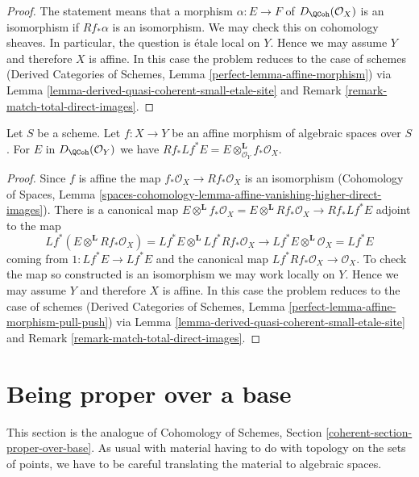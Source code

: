 \begin{proof}
The statement means that a morphism $\alpha : E \to F$ of
$D_\QCoh(\mathcal{O}_X)$ is an isomorphism if
$Rf_*\alpha$ is an isomorphism. We may check this on cohomology sheaves.
In particular, the question is \'etale local on $Y$. Hence we may assume
$Y$ and therefore $X$ is affine. In this case the problem reduces to the
case of schemes
(Derived Categories of Schemes, Lemma \ref{perfect-lemma-affine-morphism})
via Lemma \ref{lemma-derived-quasi-coherent-small-etale-site} and
Remark \ref{remark-match-total-direct-images}.
\end{proof}

\begin{lemma}
\label{lemma-affine-morphism-pull-push}
Let $S$ be a scheme. Let $f : X \to Y$ be an affine morphism of algebraic
spaces over $S$. For $E$ in $D_\QCoh(\mathcal{O}_Y)$ we have
$Rf_* Lf^* E = E \otimes^\mathbf{L}_{\mathcal{O}_Y} f_*\mathcal{O}_X$.
\end{lemma}

\begin{proof}
Since $f$ is affine the map $f_*\mathcal{O}_X \to Rf_*\mathcal{O}_X$
is an isomorphism (Cohomology of Spaces, Lemma
\ref{spaces-cohomology-lemma-affine-vanishing-higher-direct-images}).
There is a canonical map
$E \otimes^\mathbf{L} f_*\mathcal{O}_X =
E \otimes^\mathbf{L} Rf_*\mathcal{O}_X \to Rf_* Lf^* E$
adjoint to the map
$$
Lf^*(E \otimes^\mathbf{L} Rf_*\mathcal{O}_X) =
Lf^*E \otimes^\mathbf{L} Lf^*Rf_*\mathcal{O}_X \longrightarrow
Lf^* E \otimes^\mathbf{L} \mathcal{O}_X = Lf^* E
$$
coming from $1 : Lf^*E \to Lf^*E$ and the canonical map
$Lf^*Rf_*\mathcal{O}_X \to \mathcal{O}_X$. To check the map so constructed
is an isomorphism we may work locally on $Y$. Hence we may assume
$Y$ and therefore $X$ is affine. In this case the problem reduces to the
case of schemes
(Derived Categories of Schemes, Lemma
\ref{perfect-lemma-affine-morphism-pull-push})
via Lemma \ref{lemma-derived-quasi-coherent-small-etale-site} and
Remark \ref{remark-match-total-direct-images}.
\end{proof}








\section{Being proper over a base}
\label{section-proper-over-base}

\noindent
This section is the analogue of Cohomology of Schemes, Section
\ref{coherent-section-proper-over-base}.
As usual with material having to do with topology on the sets of points,
we have to be careful translating the material to algebraic spaces.

